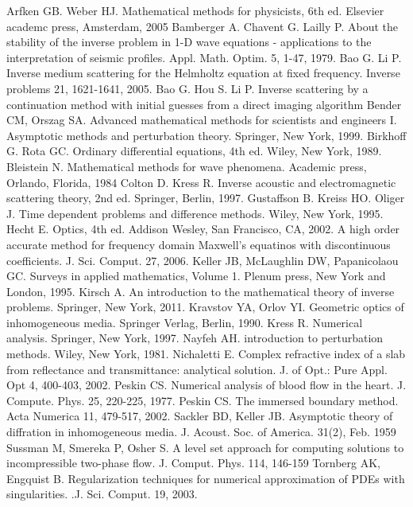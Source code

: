 \documentclass[12pt,twoside]{report}
\begin{document}
\newpage
\begin{thebibliography}{2d}
Arfken GB. Weber HJ. Mathematical methods for physicists, 6th ed. Elsevier academc press, Amsterdam, 2005
Bamberger A. Chavent G. Lailly P. About the stability of the inverse problem in 1-D wave equations - applications to the interpretation of seismic profiles. Appl. Math. Optim. 5, 1-47, 1979.
Bao G. Li P. Inverse medium scattering for the Helmholtz equation at fixed frequency. Inverse problems 21, 1621-1641, 2005.
Bao G. Hou S. Li P. Inverse scattering by a continuation method with initial guesses from a direct imaging algorithm
Bender CM, Orszag SA. Advanced mathematical methods for scientists and engineers I. Asymptotic methods and perturbation theory. Springer, New York, 1999.
Birkhoff G. Rota GC. Ordinary differential equations, 4th ed. Wiley, New York, 1989.
Bleistein N. Mathematical methods for wave phenomena. Academic press, Orlando, Florida, 1984
Colton D. Kress R. Inverse acoustic and electromagnetic scattering theory, 2nd ed. Springer, Berlin, 1997.
Gustaffson B. Kreiss HO. Oliger J. Time dependent problems and difference methods. Wiley, New York, 1995.
Hecht E. Optics, 4th ed. Addison Wesley, San Francisco, CA, 2002.
A high order accurate method for frequency domain Maxwell's equatinos with discontinuous coefficients. J. Sci. Comput. 27, 2006.
Keller JB, McLaughlin DW, Papanicolaou GC. Surveys in applied mathematics, Volume 1. Plenum press, New York and London, 1995.
Kirsch A. An introduction to the mathematical theory of inverse problems. Springer, New York, 2011. 
Kravstov YA, Orlov YI. Geometric optics of inhomogeneous media. Springer Verlag, Berlin, 1990.
Kress R. Numerical analysis. Springer, New York, 1997.
Nayfeh AH. introduction to perturbation methods. Wiley, New York, 1981.
Nichaletti E. Complex refractive index of a slab from reflectance and transmittance: analytical solution. J. of Opt.: Pure  Appl. Opt 4, 400-403, 2002. 
Peskin CS. Numerical analysis of blood flow in the heart. J. Compute. Phys. 25, 220-225, 1977.
Peskin CS. The immersed boundary method. Acta Numerica 11, 479-517, 2002.
Sackler BD, Keller JB. Asymptotic theory of diffration in inhomogeneous media. J. Acoust. Soc. of America. 31(2), Feb. 1959
Sussman M, Smereka P, Osher S. A level set approach for computing solutions to incompressible two-phase flow. J. Comput. Phys. 114, 146-159
Tornberg AK, Engquist B. Regularization techniques for numerical approximation of PDEs with singularities. .J. Sci. Comput. 19, 2003.

\end{thebibliography}
\end{document}
